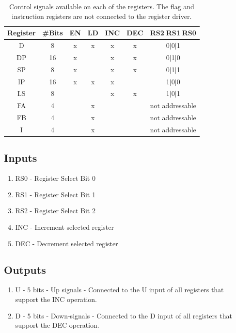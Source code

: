 \begin{table}[H]
  \centering
  \begin{tabular}{c|c|c|c|c|c|c}
    Register & \#Bits & EN  & LD  & INC  & DEC & RS2$|$RS1$|$RS0 \\ \hline 
    D        & 8      & x   & x   & x    & x   & 0$|$0$|$1 \\
    DP       & 16     & x   &     & x    & x   & 0$|$1$|$0 \\ 
    SP       & 8      & x   &     & x    & x   & 0$|$1$|$1 \\ 
    IP       & 16     & x   & x   & x    &     & 1$|$0$|$0 \\ 
    LS       & 8      &     &     & x    & x   & 1$|$0$|$1 \\ 
    FA       & 4      &     & x   &      &     & not addressable \\ 
    FB       & 4      &     & x   &      &     & not addressable  \\
    I        & 4      &     & x   &      &     & not addressable \\
  \end{tabular}
  \caption{Control signals available on each of the registers. The flag and instruction registers are not connected to the register driver.}
  \label{tab:registers}
\end{table}

\subsection*{Inputs}
\begin{enumerate}
  \itemsep0em
\item RS0 - Register Select Bit 0
\item RS1 - Register Select Bit 1
\item RS2 - Register Select Bit 2
\item INC - Increment selected register
\item DEC - Decrement selected register
\end{enumerate}

\subsection*{Outputs}
\begin{enumerate}
\itemsep0em 
\item U - 5 bits - Up signals - Connected to the U input of all registers that support the INC operation.
\item D - 5 bits - Down-signals - Connected to the D input of all registers that support the DEC operation.
\end{enumerate}


